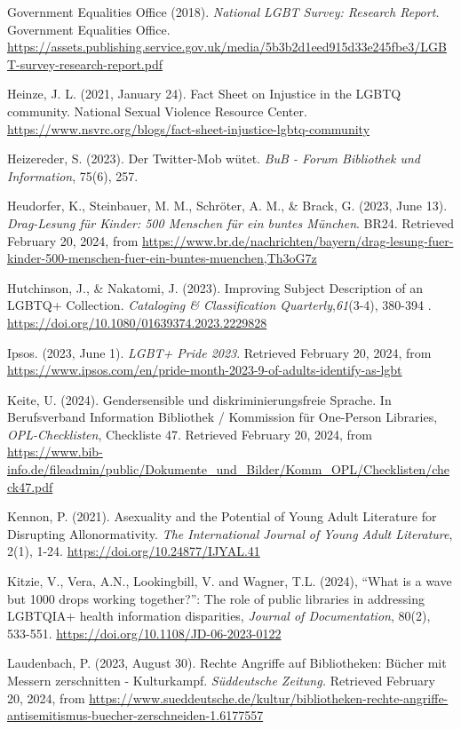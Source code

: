 \documentclass[a4paper,
fontsize=11pt,
oneside,
numbers=noperiodatend,
parskip=half-,
bibliography=totoc,
final
]{scrartcl}
\begin{document}
Government Equalities Office (2018). \emph{National LGBT Survey:
Research Report.} Government Equalities Office.
\url{https://assets.publishing.service.gov.uk/media/5b3b2d1eed915d33e245fbe3/LGBT-survey-research-report.pdf}

Heinze, J. L. (2021, January 24). Fact Sheet on Injustice in the LGBTQ
community. National Sexual Violence Resource Center.
\url{https://www.nsvrc.org/blogs/fact-sheet-injustice-lgbtq-community}

Heizereder, S. (2023). Der Twitter-Mob wütet. \emph{BuB - Forum
Bibliothek und Information}, 75(6), 257.

Heudorfer, K., Steinbauer, M. M., Schröter, A. M., \& Brack, G. (2023,
June 13). \emph{Drag-Lesung für Kinder: 500 Menschen für ein buntes
München}. BR24. Retrieved February 20, 2024, from
\url{https://www.br.de/nachrichten/bayern/drag-lesung-fuer-kinder-500-menschen-fuer-ein-buntes-muenchen,Th3oG7z}

Hutchinson, J., \& Nakatomi, J. (2023). Improving Subject Description of
an LGBTQ+ Collection. \emph{Cataloging \& Classification
Quarterly},\emph{61}(3-4), 380-394 .
\url{https://doi.org/10.1080/01639374.2023.2229828}

Ipsos. (2023, June 1). \emph{LGBT+ Pride 2023}. Retrieved February 20,
2024, from
\url{https://www.ipsos.com/en/pride-month-2023-9-of-adults-identify-as-lgbt}

Keite, U. (2024). Gendersensible und diskriminierungsfreie Sprache. In
Berufsverband Information Bibliothek / Kommission für One-Person
Libraries, \emph{OPL-Checklisten}, Checkliste 47. Retrieved February 20,
2024, from
\url{https://www.bib-info.de/fileadmin/public/Dokumente_und_Bilder/Komm_OPL/Checklisten/check47.pdf}

Kennon, P. (2021). Asexuality and the Potential of Young Adult
Literature for Disrupting Allonormativity. \emph{The International
Journal of Young Adult Literature}, 2(1), 1-24.
\url{https://doi.org/10.24877/IJYAL.41}

Kitzie, V., Vera, A.N., Lookingbill, V. and Wagner, T.L. (2024), \enquote{What
is a wave but 1000 drops working together?}: The role of public
libraries in addressing LGBTQIA+ health information
disparities\textquotesingle, \emph{Journal of Documentation}, 80(2),
533-551. \url{https://doi.org/10.1108/JD-06-2023-0122}

Laudenbach, P. (2023, August 30). Rechte Angriffe auf Bibliotheken:
Bücher mit Messern zerschnitten - Kulturkampf. \emph{Süddeutsche
Zeitung.} Retrieved February 20, 2024, from
\url{https://www.sueddeutsche.de/kultur/bibliotheken-rechte-angriffe-antisemitismus-buecher-zerschneiden-1.6177557}
\end{document}
